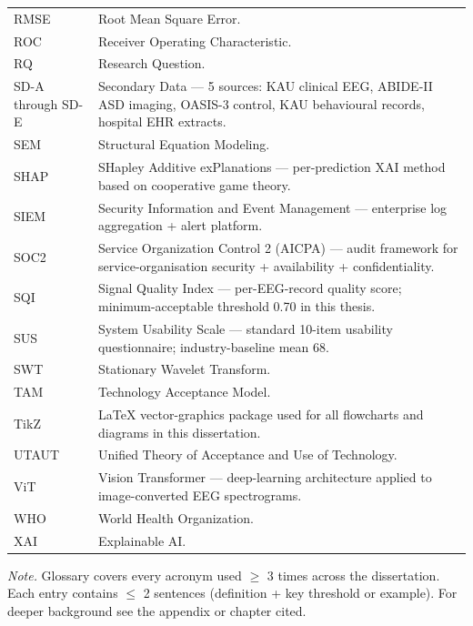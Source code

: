 {\begin{xltabular}{\textwidth}{@{} >{\raggedright\arraybackslash}p{2.6cm} L @{}}
RMSE & Root Mean Square Error. \\
ROC & Receiver Operating Characteristic. \\
RQ & Research Question. \\
SD-A through SD-E & Secondary Data --- 5 sources: KAU clinical EEG, ABIDE-II ASD imaging, OASIS-3 control, KAU behavioural records, hospital EHR extracts. \\
SEM & Structural Equation Modeling. \\
SHAP & SHapley Additive exPlanations --- per-prediction XAI method based on cooperative game theory. \\
SIEM & Security Information and Event Management --- enterprise log aggregation + alert platform. \\
SOC2 & Service Organization Control 2 (AICPA) --- audit framework for service-organisation security + availability + confidentiality. \\
SQI & Signal Quality Index --- per-EEG-record quality score; minimum-acceptable threshold 0.70 in this thesis. \\
SUS & System Usability Scale --- standard 10-item usability questionnaire; industry-baseline mean 68. \\
SWT & Stationary Wavelet Transform. \\
TAM & Technology Acceptance Model. \\
TikZ & LaTeX vector-graphics package used for all flowcharts and diagrams in this dissertation. \\
UTAUT & Unified Theory of Acceptance and Use of Technology. \\
ViT & Vision Transformer --- deep-learning architecture applied to image-converted EEG spectrograms. \\
WHO & World Health Organization. \\
XAI & Explainable AI. \\
\end{xltabular}}
\vspace{0.3em}\noindent\textit{Note.} Glossary covers every acronym used $\geq$ 3 times across the dissertation. Each entry contains $\leq$ 2 sentences (definition + key threshold or example). For deeper background see the appendix or chapter cited.
